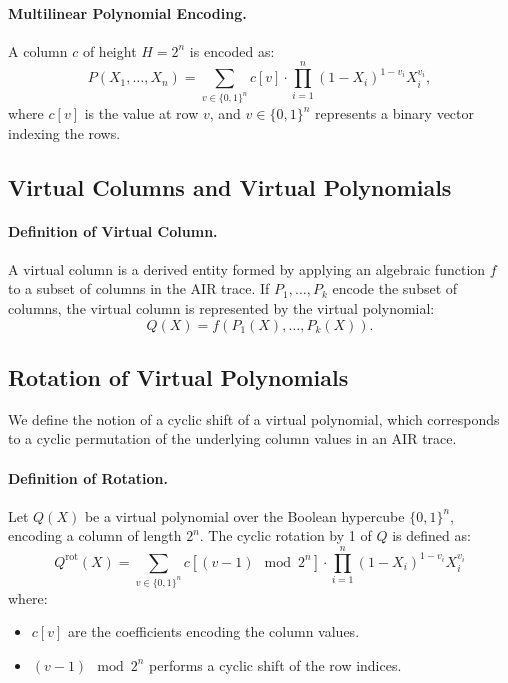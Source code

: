\documentclass{article}
\begin{document}
\paragraph{Multilinear Polynomial Encoding.} A column \( c \) of height \( H = 2^n \) is encoded as:
\[
P(X_1, \dots, X_n) = \sum_{v \in \{0, 1\}^n} c[v] \cdot \prod_{i=1}^n (1 - X_i)^{1-v_i} X_i^{v_i},
\]
where \( c[v] \) is the value at row \( v \), and \( v \in \{0, 1\}^n \) represents a binary vector indexing the rows.


\subsection{Virtual Columns and Virtual Polynomials}

\paragraph{Definition of Virtual Column.} A virtual column is a derived entity formed by applying an algebraic function \( f \) to a subset of columns in the AIR trace. If \( P_1, \dots, P_k \) encode the subset of columns, the virtual column is represented by the virtual polynomial:
\[
Q(X) = f(P_1(X), \dots, P_k(X)).
\]

\subsection{Rotation of Virtual Polynomials}

We define the notion of a cyclic shift of a virtual polynomial, which corresponds to a cyclic permutation of the underlying column values in an AIR trace.

\paragraph{Definition of Rotation.} Let \( Q(X) \) be a virtual polynomial over the Boolean hypercube \( \{0, 1\}^n \), encoding a column of length \( 2^n \). The cyclic rotation by 1 of \( Q \) is defined as:
\[
Q^{\text{rot}}(X) = \sum_{v \in \{0, 1\}^n} c[(v - 1) \mod 2^n] \cdot \prod_{i=1}^n (1 - X_i)^{1 - v_i} X_i^{v_i}
\]
where:
\begin{itemize}
    \item \( c[v] \) are the coefficients encoding the column values.
    \item \( (v - 1) \mod 2^n \) performs a cyclic shift of the row indices.
\end{itemize}
\end{document}
